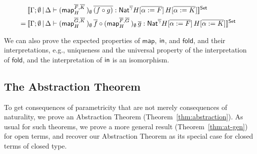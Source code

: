\documentclass[runningheads]{llncs}
\newcommand{\map}{\mathsf{map}}
\newcommand{\fold}{\mathsf{fold}}
\begin{document}
  \vspace*{-0.2in}
  
  \begin{align*}
&\setsem{
\Gamma; \emptyset \,|\, \Delta \vdash 
  (\map^{\ol{F}, \ol{K}}_H \,)_{\emptyset} \, \ol{(f \circ g)}
  : \Nat^{\ol\gamma} H[\ol{\alpha := F}] \, H[\ol{\alpha := K}]} \\ 
= \hspace{0.03in} 
  &\setsem{
  \Gamma; \emptyset \,|\, \Delta \vdash 
  (\map^{\ol{G}, \ol{K}}_H \,)_{\emptyset} \, \ol{f} \circ 
  (\map^{\ol{F}, \ol{G}}_H \,)_{\emptyset} \, \ol{g}
  : \Nat^{\ol\gamma} H[\ol{\alpha := F}] \, H[\ol{\alpha := K}]}
\end{align*}

    \vspace*{-0.05in}
  
\noindent
We can also prove the expected properties of $\map$, $\mathsf{in}$, and
$\fold$, and their interpretations, e.g., uniqueness and the universal
property of the interpretation of $\fold$, and the interpretation of
$\mathsf{in}$ is an isomorphism.

\vspace*{-0.1in}

\subsection{The Abstraction Theorem}\label{sec:thms} 

\vspace*{-0.05in}

To get consequences of parametricity that are not merely consequences
of naturality, we prove an Abstraction Theorem
(Theorem~\ref{thm:abstraction}). As usual for such theorems, we prove
a more general result (Theorem~\ref{thm:at-gen}) for open terms, and
recover our Abstraction Theorem as its special case for closed terms
of closed type.

\vspace*{-0.05in}
\end{document}

